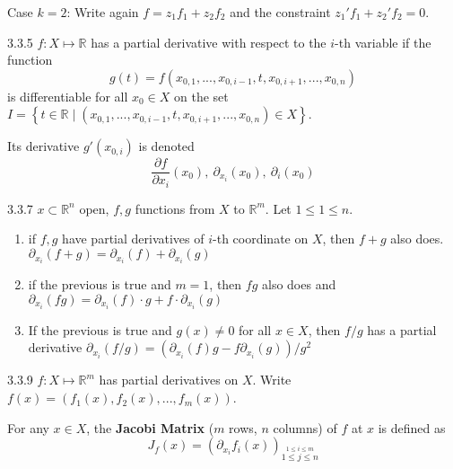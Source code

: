 \documentclass[8pt,a4paper,twocolumn,table]{extarticle}
\newcommand{\R}{\mathbb{R}}
\begin{document}
\begin{example}
    Case $k = 2$: Write again $f = z_1 f_1 + z_2 f_2$ and the constraint $z_1' f_1 + z_2' f_2 = 0$.
\end{example}

\begin{definition}{3.3.5}
    $f: X \mapsto \R $ has a partial derivative with respect to the $i$-th variable if the function
    \[ g(t) = f(x_{0,1}, ..., x_{0,i-1}, t, x_{0,i+1}, ..., x_{0,n}) \]
    is differentiable for all $x_0 \in X$ on the set $I = \left\{ t \in \R \mid (x_{0,1}, ..., x_{0,i-1}, t, x_{0,i+1}, ..., x_{0,n}) \in X \right\}$.

    Its derivative $g'(x_{0,i})$ is denoted
    \[ \frac{\partial f}{\partial x_i}(x_0),\ \partial_{x_i}(x_0),\ \partial_i (x_0) \]
\end{definition}

\begin{proposition}{3.3.7}
    $x \subset \R^n$ open, $f,g$ functions from $X$ to $\R^m$. Let $1 \le 1 \le n$.
    \begin{enumerate}
        \item if $f, g$ have partial derivatives of $i$-th coordinate on $X$, then $f + g$ also does.
              $\partial_{x_i}(f + g) = \partial_{x_i}(f) + \partial_{x_i}(g)$
        \item if the previous is true and $m = 1$, then $fg$ also does and $\partial_{x_i}(f g) = \partial_{x_i}(f) \cdot g + f \cdot \partial_{x_i}(g)$
        \item If the previous is true and $g(x) \ne 0$ for all $x \in X$, then $f / g$ has a partial derivative
              $\partial_{x_i}(f/g) = \left (\partial_{x_i}(f)g - f \partial_{x_i}(g) \right)/g^2$
    \end{enumerate}
\end{proposition}

\begin{definition}{3.3.9}
    $f: X \mapsto \R^m$ has partial derivatives on $X$. Write $f(x) = (f_1(x), f_2(x), ..., f_m(x))$.

    For any $x \in X$, the \textbf{Jacobi Matrix} ($m$ rows, $n$ columns) of $f$ at $x$ is defined as
    \[ J_f(x) = (\partial_{x_i} f_i(x))_{\stackrel{1 \le i \le m}{1 \le j \le n}} \]
\end{definition}
\end{document}
